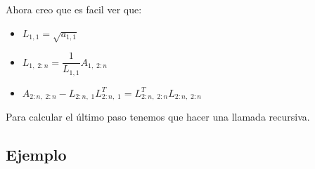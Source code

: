 \documentclass[12pt, fleqn]{report}                             %
\theoremstyle{break}                                            %
\begin{document}
                Ahora creo que es facil ver que:
                \begin{itemize}
                    \item $L_{1, 1} = \sqrt{a_{1, 1}}$
                    \item $L_{1, \; 2:n} = \dfrac{1}{L_{1,1}} A_{1, \; 2:n}$
                    \item $A_{2:n, \; 2:n} - L_{2:n, \; 1}L_{2:n, \; 1}^T = L_{2:n, \;2:n}^T L_{2:n, \;2:n}$
                \end{itemize}

                Para calcular el último paso tenemos que hacer una llamada recursiva.


            \clearpage
            \subsection{Ejemplo}
\end{document}
